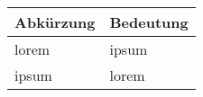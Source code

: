 
\begin{table}[h!]
    \begin{tabularx}{\textwidth}{l X}
        \toprule 
        Abkürzung & Bedeutung \\
        \midrule
        lorem & ipsum \\
        ipsum & lorem \\
        \bottomrule 
    \end{tabularx}
\end{table}
